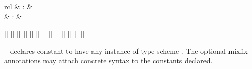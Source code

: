\begin{isabellebody}
\begin{isamarkuptext}
  \begin{matharray}{rcl}
    \hypertarget{command.consts}{\hyperlink{command.consts}{\mbox{}}} & : &  \\
    \hypertarget{command.defs}{\hyperlink{command.defs}{\mbox{}}} & : &  \\
  \end{matharray}

  \begin{railoutput}
[]
\rail@plus
{}[]
[]
[]
\rail@bar
{}
[]
\rail@endbar
{}
\rail@endplus
\rail@end
{}
[]
\rail@bar
{}
[]
\rail@endbar
\rail@plus
{}[]
[]
\rail@endplus
\rail@end
{}
[]
\rail@bar
{}
[]
\rail@endbar
\rail@bar
{}
[]
\rail@endbar
{}[]
\rail@end
\end{railoutput}


  \begin{description}

  \item \hyperlink{command.consts}{\mbox{}}~ declares constant  to have any instance of type scheme .  The optional
  mixfix annotations may attach concrete syntax to the constants
  declared.
  

\end{description}
\end{isamarkuptext}
\end{isabellebody}
